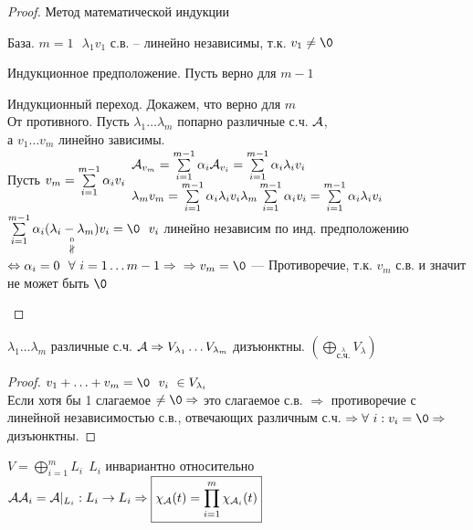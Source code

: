 \documentclass[../main.tex]{subfiles}
\begin{document}
	\begin{proof} Метод математической индукции
		\begin{mylist}
			\item База. $m=1 \ \ \ \lambda_1 v_1$ с.в. -- линейно независимы, т.к. $v_1\neq \0$
			\item Индукционное предположение. Пусть верно для $m-1$
			\item Индукционный переход. Докажем, что верно для $m$\\
			От противного. Пусть $\lambda_1\ldots \lambda_m $ попарно различные с.ч. $\mathcal{A}$,\\
			а $v_1\ldots v_m$ линейно зависимы.\\
			Пусть $v_m = \sum\limits_{i=1}^{m-1}\alpha_i v_i\\
			\begin{array}{l}
			\mathcal{A}_{v_m} = \sum\limits_{i=1}^{m-1}\alpha_i \mathcal{A}_{v_i} = \sum\limits_{i=1}^{m-1} \alpha_i \lambda_i v_i\\
			\lambda_m v_m = \sum\limits_{i=1}^{m-1} \alpha_i \lambda_i v_i
			\lambda_m \sum\limits_{i=1}^{m-1}\alpha_i v_i = \sum\limits_{i=1}^{m-1} \alpha_i \lambda_i v_i
			\end{array}$\\
			$\sum\limits_{i=1}^{m-1}\alpha_i(\underset{\stackrel{0}{\nparallel}}{\lambda_i - \lambda_m})v_i = \0 \ \ v_i$ линейно независим по инд. предположению\\
			$\Leftrightarrow \alpha_i = 0 \ \ \forall \ i=1\ldots m-1 \Rightarrow\\
			\Rightarrow v_m = \0$ --- Противоречие, т.к. $v_m$ с.в. и значит не может быть $\0$
		\end{mylist}
	\end{proof}
	\begin{corollary}
		$\lambda_1\ldots\lambda_m$ различные с.ч. $\mathcal{A}
		\Rightarrow  V_{\lambda_1}\ldots V_{\lambda_m}$ дизъюнктны.
		$\left(\bigoplus\limits_{\stackrel{\lambda}{\text{с.ч.}}} V_\lambda\right)$ 
	\end{corollary}
	\begin{proof}
		$v_1 + \ldots +v_m = \0 \ \ v_i\ \in V_{\lambda_i}$\\
		Если хотя бы 1 слагаемое $\neq \0 \Rightarrow$ это слагаемое с.в. $\Rightarrow$ противоречие с линейной независимостью с.в., отвечающих различным с.ч. $\Rightarrow \forall \ i: v_i = \0 \Rightarrow$ дизъюнктны. 
	\end{proof}
	\begin{theorem}
		$V = \bigoplus\limits_{i=1}^m L_i \ \ L_i$ инвариантно относительно $\mathcal{A}\\
		\mathcal{A}_i = \mathcal{A}|_{L_i} : L_i \rightarrow L_i
		\Rightarrow \boxed{\chi_{\mathcal{A}}(t) = \prod_{i=1}^{m}\chi_{\mathcal{A}_i}(t)}$
	\end{theorem}
\end{document}
